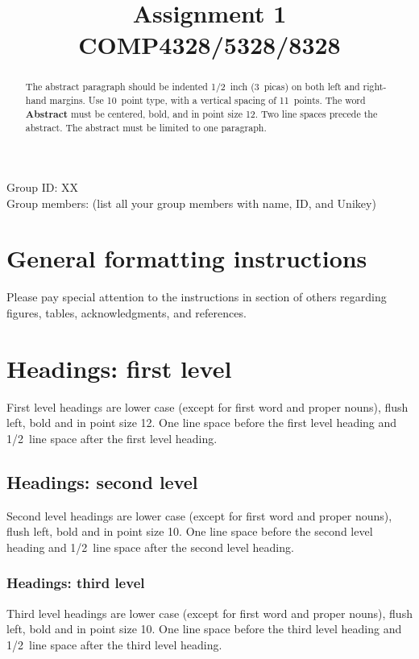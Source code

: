 \documentclass{article} %
\title{Assignment 1\\  COMP4328/5328/8328}
\begin{document}
\maketitle

Group ID: XX\\
Group members: (list all your group members with name, ID, and Unikey)\\

\begin{abstract}
The abstract paragraph should be indented 1/2~inch (3~picas) on both left and
right-hand margins. Use 10~point type, with a vertical spacing of 11~points.
The word \textbf{Abstract} must be centered, bold, and in point size 12. Two
line spaces precede the abstract. The abstract must be limited to one
paragraph.
\end{abstract}


\section{General formatting instructions}
\label{gen_inst}

Please pay special attention to the instructions in section of others
regarding figures, tables, acknowledgments, and references.

\section{Headings: first level}
\label{headings}

First level headings are lower case (except for first word and proper nouns),
flush left, bold and in point size 12. One line space before the first level
heading and 1/2~line space after the first level heading.

\subsection{Headings: second level}

Second level headings are lower case (except for first word and proper nouns),
flush left, bold and in point size 10. One line space before the second level
heading and 1/2~line space after the second level heading.

\subsubsection{Headings: third level}

Third level headings are lower case (except for first word and proper nouns),
flush left, bold and in point size 10. One line space before the third level
heading and 1/2~line space after the third level heading.
\end{document}
